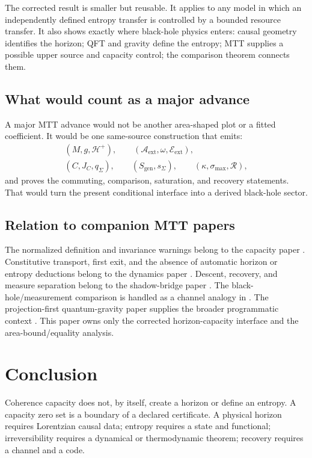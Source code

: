 \documentclass[11pt,a4paper]{article}
\numberwithin{equation}{section}
\theoremstyle{definition}
\theoremstyle{remark}
\newcommand{\cA}{\mathcal A}
\newcommand{\cE}{\mathcal E}
\newcommand{\cH}{\mathcal H}
\newcommand{\cR}{\mathcal R}
\begin{document}
The corrected result is smaller but reusable.  It applies to any model in
which an independently defined entropy transfer is controlled by a
bounded resource transfer.  It also shows exactly where black-hole
physics enters: causal geometry identifies the horizon; QFT and gravity
define the entropy; MTT supplies a possible upper source and capacity
control; the comparison theorem connects them.

\subsection{What would count as a major advance}

A major MTT advance would not be another area-shaped plot or a fitted
coefficient.  It would be one same-source construction that emits:
\[
\begin{gathered}
  (M,g,\cH^+),\qquad
  (\cA_{\mathrm{ext}},\omega,\cE_{\mathrm{ext}}),\\
  (C,J_C,q_\Sigma),\qquad
  (S_{\mathrm{gen}},s_\Sigma),\qquad
  (\kappa,\sigma_{\max},\cR),
\end{gathered}
\]
and proves the commuting, comparison, saturation, and recovery
statements.  That would turn the present conditional interface into a
derived black-hole sector.

\subsection{Relation to companion MTT papers}

The normalized definition and invariance warnings belong to the capacity
paper \cite{NeroCapacity}.  Constitutive transport, first exit, and the
absence of automatic horizon or entropy deductions belong to the
dynamics paper \cite{NeroDynamics}.  Descent, recovery, and measure
separation belong to the shadow-bridge paper
\cite{NeroShadowBridges}.  The black-hole/measurement comparison is
handled as a channel analogy in \cite{NeroBlackHole}.  The projection-first
quantum-gravity paper supplies the broader programmatic context
\cite{NeroProjectionQG}.  This paper owns only the corrected
horizon-capacity interface and the area-bound/equality analysis.

\section{Conclusion}

Coherence capacity does not, by itself, create a horizon or define an
entropy.  A capacity zero set is a boundary of a declared certificate.
A physical horizon requires Lorentzian causal data; entropy requires a
state and functional; irreversibility requires a dynamical or
thermodynamic theorem; recovery requires a channel and a code.
\end{document}
